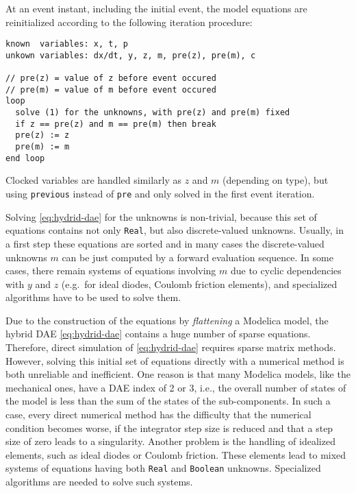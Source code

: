 At an event instant, including the initial event, the model equations are reinitialized according to the following iteration procedure:
\begin{lstlisting}[language=modelica]
known  variables: x, t, p
unkown variables: dx/dt, y, z, m, pre(z), pre(m), c

// pre(z) = value of z before event occured
// pre(m) = value of m before event occured
loop
  solve (1) for the unknowns, with pre(z) and pre(m) fixed
  if z == pre(z) and m == pre(m) then break
  pre(z) := z
  pre(m) := m
end loop
\end{lstlisting}

Clocked variables are handled similarly as $z$ and $m$ (depending on type), but using \lstinline!previous! instead of \lstinline!pre! and only solved in the first event iteration.

Solving \eqref{eq:hydrid-dae} for the unknowns is non-trivial, because this set of equations contains not only \lstinline!Real!, but also discrete-valued unknowns.
Usually, in a first step these equations are sorted and in many cases the discrete-valued unknowns $m$ can be just computed by a forward evaluation sequence.
In some cases, there remain systems of equations involving $m$ due to cyclic dependencies with $y$ and $z$ (e.g.\ for ideal diodes, Coulomb friction elements), and specialized algorithms have to be used to solve them.

Due to the construction of the equations by \emph{flattening} a Modelica model, the hybrid DAE \eqref{eq:hydrid-dae} contains a huge number of sparse equations.
Therefore, direct simulation of \eqref{eq:hydrid-dae} requires sparse matrix methods.
However, solving this initial set of equations directly with a numerical method is both unreliable and inefficient.
One reason is that many Modelica models, like the mechanical ones, have a DAE index of 2 or 3, i.e., the overall number of states of the model is less than the sum of the states of the sub-components.
In such a case, every direct numerical method has the difficulty that the numerical condition becomes worse, if the integrator step size is reduced and that a step size of zero leads to a singularity.
Another problem is the handling of idealized elements, such as ideal diodes or Coulomb friction.
These elements lead to mixed systems of equations having both \lstinline!Real! and \lstinline!Boolean! unknowns.
Specialized algorithms are needed to solve such systems.

